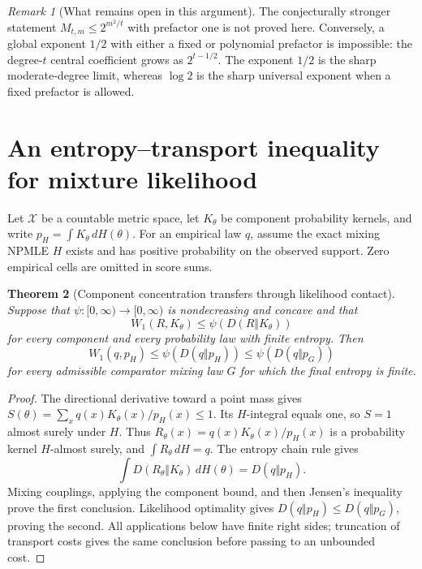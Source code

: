 \documentclass[11pt,a4paper]{article}
\newtheorem{theorem}{Theorem}[section]
\theoremstyle{definition}
\theoremstyle{remark}
\newtheorem{remark}[theorem]{Remark}
\numberwithin{equation}{section}
\begin{document}
\begin{remark}[What remains open in this argument]
The conjecturally stronger statement $M_{t,m}\le2^{m^2/t}$ with
prefactor one is not proved here. Conversely, a global exponent
$1/2$ with either a fixed or polynomial prefactor is impossible:
the degree-$t$ central coefficient grows as $2^{t-1/2}$.
The exponent $1/2$ is the sharp moderate-degree limit, whereas
$\log2$ is the sharp universal exponent when a fixed prefactor is allowed.
\end{remark}

\section{An entropy--transport inequality for mixture likelihood}
\label{E:et:section}

Let $\mathcal X$ be a countable metric space, let $K_\theta$ be component
probability kernels, and write $p_H=\int K_\theta\,dH(\theta)$.
For an empirical law $q$, assume the exact mixing NPMLE $H$ exists
and has positive probability on the observed support. Zero empirical
cells are omitted in score sums.

\begin{theorem}[Component concentration transfers through likelihood contact]
\label{E:et:transfer}
Suppose that $\psi:[0,\infty)\to[0,\infty)$ is nondecreasing and
concave and that
\[
                 W_1(R,K_\theta)\le\psi(D(R\Vert K_\theta))
\]
for every component and every probability law with finite entropy.
Then
\[
             W_1(q,p_H)\le\psi(D(q\Vert p_H))
                       \le\psi(D(q\Vert p_G))
\]
for every admissible comparator mixing law $G$ for which the final
entropy is finite.
\end{theorem}
\begin{proof}
The directional derivative toward a point mass gives
$S(\theta)=\sum_xq(x)K_\theta(x)/p_H(x)\le1$.
Its $H$-integral equals one, so $S=1$ almost surely under $H$.
Thus $R_\theta(x)=q(x)K_\theta(x)/p_H(x)$ is a probability kernel
$H$-almost surely, and $\int R_\theta\,dH=q$. The entropy chain rule gives
\[
 \int D(R_\theta\Vert K_\theta)\,dH(\theta)=D(q\Vert p_H).
\]
Mixing couplings, applying the component bound, and then Jensen's
inequality prove the first conclusion. Likelihood optimality gives
$D(q\Vert p_H)\le D(q\Vert p_G)$, proving the second.
All applications below have finite right sides; truncation of transport
costs gives the same conclusion before passing to an unbounded cost.
\end{proof}
\end{document}
